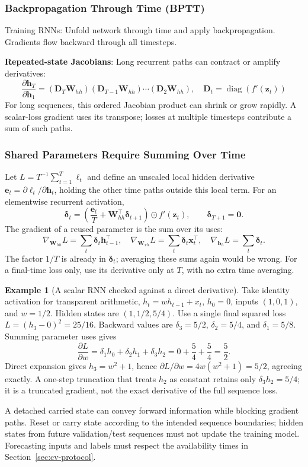 \documentclass[11pt,twoside]{article}
\numberwithin{equation}{section}
\newcommand{\vect}[1]{\bm{#1}}
\newcommand{\mat}[1]{\bm{#1}}
\theoremstyle{plain}
\theoremstyle{definition}
\newtheorem{example}[theorem]{Example}
\theoremstyle{remark}
\begin{document}
\subsubsection{Backpropagation Through Time (BPTT)}

Training RNNs: Unfold network through time and apply backpropagation. Gradients flow backward through all timesteps.

\textbf{Repeated-state Jacobians}: Long recurrent paths can contract or amplify derivatives:
\[
\frac{\partial\vect{h}_T}{\partial\vect{h}_1}
=(\mat{D}_T\vect{W}_{hh})(\mat{D}_{T-1}\vect{W}_{hh})\cdots(\mat{D}_2\vect{W}_{hh}),
\quad\mat{D}_t=\operatorname{diag}(f'(\vect{z}_t))
\]
For long sequences, this ordered Jacobian product can shrink or grow rapidly. A scalar-loss gradient uses its transpose; losses at multiple timesteps contribute a sum of such paths.

\subsubsection{Shared Parameters Require Summing Over Time}
Let $L=T^{-1}\sum_{t=1}^T\ell_t$ and define an unscaled local hidden derivative $\vect e_t=\partial\ell_t/\partial\vect h_t$, holding the other time paths outside this local term. For an elementwise recurrent activation,
\[
\vect\delta_t=\left(\frac{\vect e_t}{T}+\mat W_{hh}^\top\vect\delta_{t+1}\right)\odot f'(\vect z_t),\qquad\vect\delta_{T+1}=\vect0.
\]
The gradient of a reused parameter is the sum over its uses:
\[
\nabla_{\mat W_{hh}}L=\sum_t\vect\delta_t\vect h_{t-1}^\top,\quad
\nabla_{\mat W_{xh}}L=\sum_t\vect\delta_t\vect x_t^\top,\quad
\nabla_{\vect b_h}L=\sum_t\vect\delta_t.
\]
The factor $1/T$ is already in $\vect\delta_t$; averaging these sums again would be wrong. For a final-time loss only, use its derivative only at $T$, with no extra time averaging.

\begin{example}[A scalar RNN checked against a direct derivative]
Take identity activation for transparent arithmetic, $h_t=w h_{t-1}+x_t$, $h_0=0$, inputs $(1,0,1)$, and $w=1/2$. Hidden states are $(1,1/2,5/4)$. Use a single final squared loss $L=(h_3-0)^2=25/16$. Backward values are $\delta_3=5/2$, $\delta_2=5/4$, and $\delta_1=5/8$. Summing parameter uses gives
\[
\frac{\partial L}{\partial w}=\delta_1h_0+\delta_2h_1+\delta_3h_2
=0+\frac54+\frac54=\frac52.
\]
Direct expansion gives $h_3=w^2+1$, hence $\partial L/\partial w=4w(w^2+1)=5/2$, agreeing exactly. A one-step truncation that treats $h_2$ as constant retains only $\delta_3h_2=5/4$; it is a truncated gradient, not the exact derivative of the full sequence loss.
\end{example}
A detached carried state can convey forward information while blocking gradient paths. Reset or carry state according to the intended sequence boundaries; hidden states from future validation/test sequences must not update the training model. Forecasting inputs and labels must respect the availability times in Section~\ref{sec:cv-protocol}.
\end{document}

